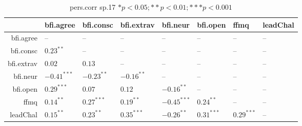 \begin{table}[ht]
\centering
\begin{tabular}{rlllllll}
  \hline
 & bfi.agree & bfi.consc & bfi.extrav & bfi.neur & bfi.open & ffmq & leadChal \\ 
  \hline
bfi.agree & -- & -- & -- & -- & -- & -- & -- \\ 
  bfi.consc & $0.23^{**}$ & -- & -- & -- & -- & -- & -- \\ 
  bfi.extrav & $0.02$ & $0.13$ & -- & -- & -- & -- & -- \\ 
  bfi.neur & $-0.41^{***}$ & $-0.23^{**}$ & $-0.16^{**}$ & -- & -- & -- & -- \\ 
  bfi.open & $0.29^{***}$ & $0.07$ & $0.12$ & $-0.16^{**}$ & -- & -- & -- \\ 
  ffmq & $0.14^{**}$ & $0.27^{***}$ & $0.19^{**}$ & $-0.45^{***}$ & $0.24^{**}$ & -- & -- \\ 
  leadChal & $0.15^{**}$ & $0.23^{**}$ & $0.35^{***}$ & $-0.26^{**}$ & $0.31^{***}$ & $0.29^{***}$ & -- \\ 
   \hline
\end{tabular}
\caption{pers.corr sp.17 $* p < 0.05; ** p < 0.01; *** p < 0.001$} 
\label{freq_corr.pers.corr.sp.17}
\end{table}
